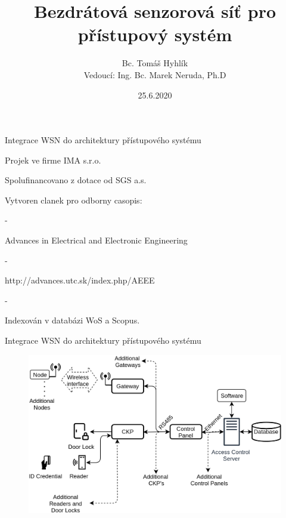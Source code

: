 \documentclass{beamer}
\title{Bezdrátová senzorová síť pro přístupový systém}
\date{25.6.2020}
\author{Bc. Tomáš Hyhlík \\
Vedoucí: Ing. Bc. Marek Neruda, Ph.D}
\institute{Katedra Mikroelektroniky}
\newcommand{\SubItem}[1]{
    {\setlength\itemindent{15pt} \item[]#1}
}
\begin{document}
	\maketitle
  



\begin{frame}{Integrace WSN do architektury přístupového systému}

	\begin{itemize}
		\item Projek ve firme IMA s.r.o.
		\item Spolufinancovano z dotace od SGS a.s.

		\item Vytvoren clanek pro odborny casopis:
		\SubItem 	- Advances in Electrical and Electronic Engineering
		\SubItem 	- http://advances.utc.sk/index.php/AEEE
		\SubItem 	- Indexován v databázi WoS a Scopus.

	\end{itemize}

\end{frame}

	

\begin{frame}{Integrace WSN do architektury přístupového systému}

	\begin{figure}[h]
		\centering
		\includegraphics[width=1\textwidth]{ACS_IoT_extension_21}
		\label{fig:ACS architecture IMA with geteway}
	\end{figure}
		
\end{frame}
\end{document}
